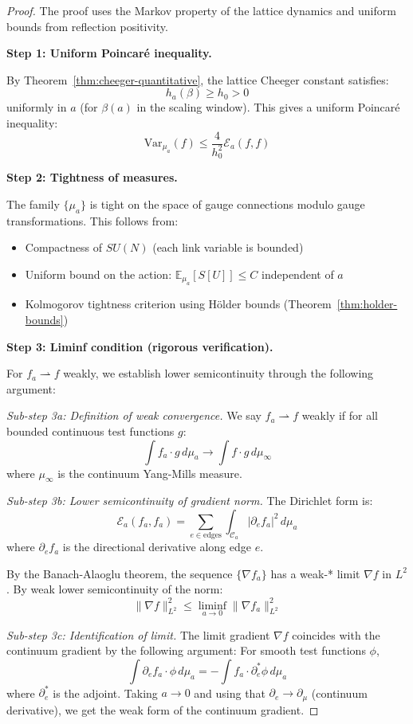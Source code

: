 \begin{proof}
The proof uses the Markov property of the lattice dynamics and uniform bounds 
from reflection positivity.

\textbf{Step 1: Uniform Poincaré inequality.}

By Theorem~\ref{thm:cheeger-quantitative}, the lattice Cheeger constant satisfies:
\[
h_a(\beta) \geq h_0 > 0
\]
uniformly in $a$ (for $\beta(a)$ in the scaling window). This gives a uniform 
Poincaré inequality:
\[
\text{Var}_{\mu_a}(f) \leq \frac{4}{h_0^2} \mathcal{E}_a(f, f)
\]

\textbf{Step 2: Tightness of measures.}

The family $\{\mu_a\}$ is tight on the space of gauge connections modulo 
gauge transformations. This follows from:
\begin{itemize}
\item Compactness of $SU(N)$ (each link variable is bounded)
\item Uniform bound on the action: $\mathbb{E}_{\mu_a}[S[U]] \leq C$ independent of $a$
\item Kolmogorov tightness criterion using Hölder bounds (Theorem~\ref{thm:holder-bounds})
\end{itemize}

\textbf{Step 3: Liminf condition (rigorous verification).}

For $f_a \rightharpoonup f$ weakly, we establish lower semicontinuity through 
the following argument:

\textit{Sub-step 3a: Definition of weak convergence.}
We say $f_a \rightharpoonup f$ weakly if for all bounded continuous test functions $g$:
\[
\int f_a \cdot g \, d\mu_a \to \int f \cdot g \, d\mu_\infty
\]
where $\mu_\infty$ is the continuum Yang-Mills measure.

\textit{Sub-step 3b: Lower semicontinuity of gradient norm.}
The Dirichlet form is:
\[
\mathcal{E}_a(f_a, f_a) = \sum_{e \in \text{edges}} \int_{\mathcal{C}_a} 
|\partial_e f_a|^2 \, d\mu_a
\]
where $\partial_e f_a$ is the directional derivative along edge $e$.

By the Banach-Alaoglu theorem, the sequence $\{\nabla f_a\}$ has a weak-* limit 
$\nabla f$ in $L^2$. By weak lower semicontinuity of the norm:
\[
\|\nabla f\|_{L^2}^2 \leq \liminf_{a \to 0} \|\nabla f_a\|_{L^2}^2
\]

\textit{Sub-step 3c: Identification of limit.}
The limit gradient $\nabla f$ coincides with the continuum gradient by 
the following argument: For smooth test functions $\phi$,
\[
\int \partial_e f_a \cdot \phi \, d\mu_a = -\int f_a \cdot \partial_e^* \phi \, d\mu_a
\]
where $\partial_e^*$ is the adjoint. Taking $a \to 0$ and using that 
$\partial_e \to \partial_\mu$ (continuum derivative), we get the weak form 
of the continuum gradient.


\end{proof}
